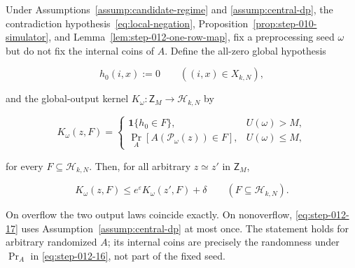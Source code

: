 \begin{proposition}\label{prop:step-012-fixed-seed-kernel}
Under Assumptions~\ref{assump:candidate-regime} and
\ref{assump:central-dp}, the contradiction hypothesis~\eqref{eq:local-negation}, Proposition~\ref{prop:step-010-simulator}, and
Lemma~\ref{lem:step-012-one-row-map}, fix a preprocessing seed \(\omega\)
but do not fix the internal coins of \(A\).  Define the all-zero global
hypothesis

\[
  h_0(i,x):=0
  \qquad ((i,x)\in X_{k,N}),
\tag{S12.15}\label{eq:step-012-15}
\]

and the global-output kernel \(K_\omega:\mathsf Z_M\to\mathcal H_{k,N}\)
by

\[
  K_\omega(z,F)=
  \begin{cases}
    \mathbf1\{h_0\in F\}, & U(\omega)>M,\\[1mm]
    \Pr_A\!\left[A(\mathcal P_\omega(z))\in F\right],
      & U(\omega)\le M,
  \end{cases}
\tag{S12.16}\label{eq:step-012-16}
\]

for every \(F\subseteq\mathcal H_{k,N}\).  Then, for all arbitrary
\(z\simeq z'\) in \(\mathsf Z_M\),

\[
  K_\omega(z,F)
  \le e^\varepsilon K_\omega(z',F)+\delta
  \qquad(F\subseteq\mathcal H_{k,N}).
\tag{S12.17}\label{eq:step-012-17}
\]

On overflow the two output laws coincide exactly.  On nonoverflow, \eqref{eq:step-012-17}
uses Assumption~\ref{assump:central-dp} at most once.  The statement holds
for arbitrary randomized \(A\); its internal coins are precisely the
randomness under \(\Pr_A\) in \eqref{eq:step-012-16}, not part of the fixed seed.
\end{proposition}

